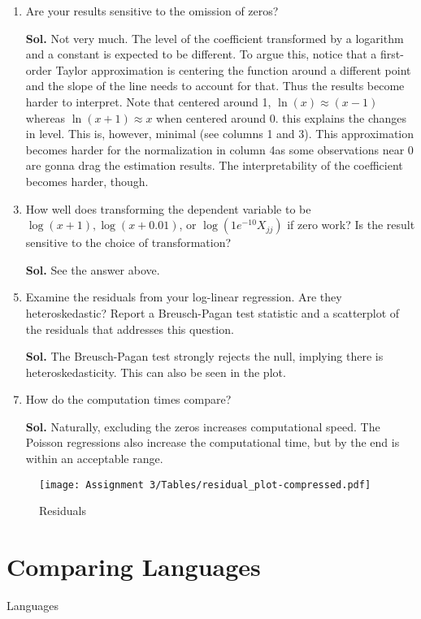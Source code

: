 \documentclass[12pt,oneside,reqno]{amsart}
\begin{document}
\begin{enumerate}[leftmargin=*,label=\textbf{(\roman*)}]
    \item Are your results sensitive to the omission of zeros?
    \item[\textbf{Sol.}] Not very much. The level of the coefficient transformed by a logarithm and a constant is expected to be different. To argue this, notice that a first-order Taylor approximation is centering the function around a different point and the slope of the line needs to account for that. Thus the results become harder to interpret. Note that centered around 1, $\ln(x)\approx (x-1)$ whereas $\ln(x+1)\approx x$ when centered around 0. this explains the changes in level. This is, however, minimal (see columns 1 and 3). This approximation becomes harder for the normalization in column 4as some observations near 0 are gonna drag the estimation results. The interpretability of the coefficient becomes harder, though. 
    \item How well does transforming the dependent variable to be $\log (x+1), \log (x+0.01)$, or $\log \left(1 e^{-10} X_{j j}\right)$ if zero work? Is the result sensitive to the choice of transformation?
    \item[\textbf{Sol.}] See the answer above. 
    \item Examine the residuals from your log-linear regression. Are they heteroskedastic? Report a Breusch-Pagan test statistic and a scatterplot of the residuals that addresses this question.
    \item[\textbf{Sol.}] The Breusch-Pagan test strongly rejects the null, implying there is heteroskedasticity. This can also be seen in the plot. 
    \item How do the computation times compare?
    \item[\textbf{Sol.}] Naturally, excluding the zeros increases computational speed. The Poisson regressions also increase the computational time, but by the end is within an acceptable range. 
\end{enumerate} 
\begin{figure}
    \centering
    \texttt{[image: Assignment 3/Tables/residual\_plot-compressed.pdf]}
    \caption{Residuals}
    \label{fig:my_label}
\end{figure}

\clearpage 
\section{Comparing Languages}
\begin{table}[htb]
    \caption{Languages}
    
\end{table}
\end{document}
